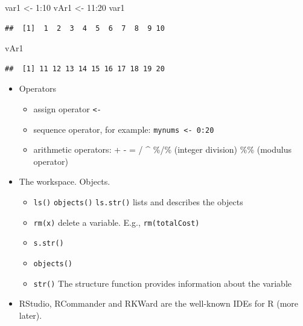 \documentclass[
]{book}
\newenvironment{Shaded}{\begin{snugshade}}{\end{snugshade}}
\newcommand{\DecValTok}[1]{\textcolor[rgb]{0.00,0.00,0.81}{#1}}
\newcommand{\NormalTok}[1]{#1}
\newcommand{\OtherTok}[1]{\textcolor[rgb]{0.56,0.35,0.01}{#1}}
\newcommand{\SpecialCharTok}[1]{\textcolor[rgb]{0.00,0.00,0.00}{#1}}
\providecommand{\tightlist}{%
  \setlength{\itemsep}{0pt}\setlength{\parskip}{0pt}}
\begin{document}
\begin{Shaded}
\begin{Highlighting}[]
\NormalTok{var1 }\OtherTok{\textless{}{-}} \DecValTok{1}\SpecialCharTok{:}\DecValTok{10}
\NormalTok{vAr1 }\OtherTok{\textless{}{-}} \DecValTok{11}\SpecialCharTok{:}\DecValTok{20}
\NormalTok{var1}
\end{Highlighting}
\end{Shaded}

\begin{verbatim}
##  [1]  1  2  3  4  5  6  7  8  9 10
\end{verbatim}

\begin{Shaded}
\begin{Highlighting}[]
\NormalTok{vAr1 }
\end{Highlighting}
\end{Shaded}

\begin{verbatim}
##  [1] 11 12 13 14 15 16 17 18 19 20
\end{verbatim}

\begin{itemize}
\item
  Operators

  \begin{itemize}
  \tightlist
  \item
    assign operator \texttt{\textless{}-}\\
  \item
    sequence operator, for example: \texttt{mynums\ \textless{}-\ 0:20}
  \item
    arithmetic operators: + - = / \^{} \%/\% (integer division) \%\% (modulus operator)
  \end{itemize}
\item
  The workspace. Objects.

  \begin{itemize}
  \tightlist
  \item
    \texttt{ls()} \texttt{objects()} \texttt{ls.str()} lists and describes the objects\\
  \item
    \texttt{rm(x)} delete a variable. E.g., \texttt{rm(totalCost)}
  \item
    \texttt{s.str()}
  \item
    \texttt{objects()}
  \item
    \texttt{str()} The structure function provides information about the variable
  \end{itemize}
\item
  RStudio, RCommander and RKWard are the well-known IDEs for R (more later).
\end{itemize}
\end{document}
